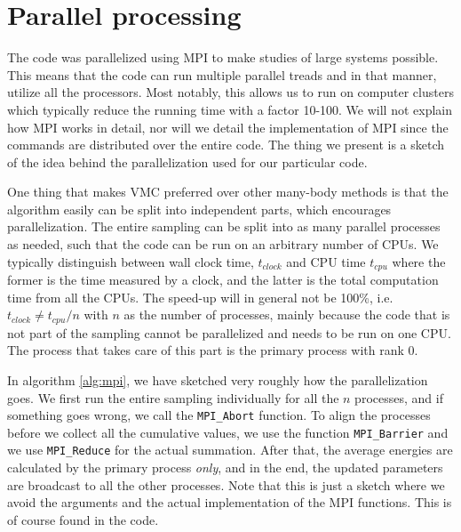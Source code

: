 \section{Parallel processing}
The code was parallelized using MPI to make studies of large systems possible. This means that the code can run multiple parallel treads and in that manner, utilize all the processors. Most notably, this allows us to run on computer clusters which typically reduce the running time with a factor 10-100. We will not explain how MPI works in detail, nor will we detail the implementation of MPI since the commands are distributed over the entire code. The thing we present is a sketch of the idea behind the parallelization used for our particular code.

One thing that makes VMC preferred over other many-body methods is that the algorithm easily can be split into independent parts, which encourages parallelization. The entire sampling can be split into as many parallel processes as needed, such that the code can be run on an arbitrary number of CPUs. We typically distinguish between wall clock time, $t_{clock}$ and CPU time $t_{cpu}$ where the former is the time measured by a clock, and the latter is the total computation time from all the CPUs. The speed-up will in general not be 100\%, i.e. $t_{clock}\neq t_{cpu}/n$ with $n$ as the number of processes, mainly because the code that is not part of the sampling cannot be parallelized and needs to be run on one CPU. The process that takes care of this part is the primary process with rank 0.

In algorithm \ref{alg:mpi}, we have sketched very roughly how the parallelization goes. We first run the entire sampling individually for all the $n$ processes, and if something goes wrong, we call the \lstinline|MPI_Abort| function. To align the processes before we collect all the cumulative values, we use the function \lstinline|MPI_Barrier| and we use \lstinline|MPI_Reduce| for the actual summation. After that, the average energies are calculated by the primary process \textit{only}, and in the end, the updated parameters are broadcast to all the other processes. Note that this is just a sketch where we avoid the arguments and the actual implementation of the MPI functions. This is of course found in the code.

